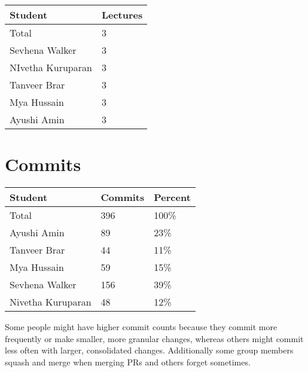 \documentclass{article}
\begin{document}
\begin{table}[H]
\centering
\begin{tabular}{ll}
\toprule
\textbf{Student} & \textbf{Lectures}\\
\midrule
Total & 3\\
Sevhena Walker & 3\\
NIvetha Kuruparan & 3\\
Tanveer Brar & 3\\
Mya Hussain & 3\\
Ayushi Amin & 3\\
\bottomrule
\end{tabular}
\end{table}

\section{Commits}


\begin{table}[H]
\centering
\begin{tabular}{lll}
\toprule
\textbf{Student} & \textbf{Commits} & \textbf{Percent}\\
\midrule
Total & 396 & 100\% \\
Ayushi Amin & 89 & 23\% \\
Tanveer Brar & 44 & 11\% \\
Mya Hussain & 59 & 15\% \\
Sevhena Walker & 156 & 39\% \\
Nivetha Kuruparan & 48 & 12\% \\
\bottomrule
\end{tabular}
\end{table}

Some people might have higher commit counts because they commit more frequently or make smaller, more granular changes, whereas others might commit less often with larger, consolidated changes. Additionally some group members squash and merge when merging PRs and others forget sometimes.

\end{document}
